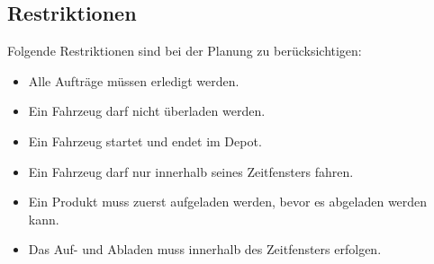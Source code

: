 \subsection{Restriktionen}
\label{sec:Restriktionen}
Folgende Restriktionen sind bei der Planung zu berücksichtigen:
\begin{itemize}
 \item Alle Aufträge müssen erledigt werden.
 \item Ein Fahrzeug darf nicht überladen werden.
 \item Ein Fahrzeug startet und endet im Depot.
 \item Ein Fahrzeug darf nur innerhalb seines Zeitfensters fahren.
 \item Ein Produkt muss zuerst aufgeladen werden, bevor es abgeladen werden kann.
 \item Das Auf- und Abladen muss innerhalb des Zeitfensters erfolgen.
\end{itemize}
